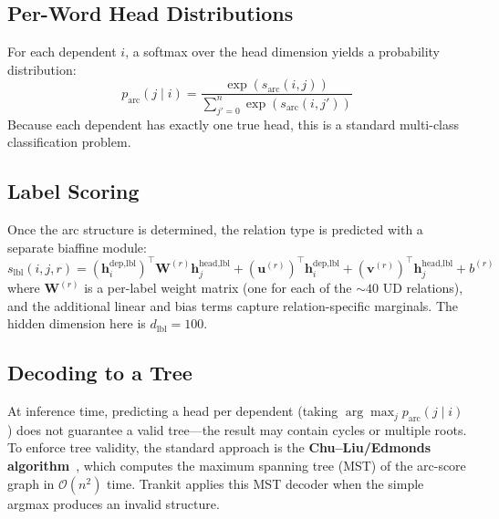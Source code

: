 \documentclass[12pt,a4paper,oneside]{report}
\begin{document}
\subsection{Per-Word Head Distributions}

For each dependent $i$, a softmax over the head dimension yields a probability
distribution:
\begin{equation}
  p_{\text{arc}}(j \mid i) = \frac{\exp(s_{\text{arc}}(i,j))}
                                  {\sum_{j' = 0}^{n} \exp(s_{\text{arc}}(i,j'))}
  \label{eq:arc_prob}
\end{equation}
Because each dependent has exactly one true head, this is a standard
multi-class classification problem.

\subsection{Label Scoring}

Once the arc structure is determined, the relation type is predicted with a
separate biaffine module:
\begin{equation}
  s_{\text{lbl}}(i,j,r) = (\mathbf{h}^{\text{dep,lbl}}_i)^\top
                            \mathbf{W}^{(r)} \mathbf{h}^{\text{head,lbl}}_j
                          + (\mathbf{u}^{(r)})^\top \mathbf{h}^{\text{dep,lbl}}_i
                          + (\mathbf{v}^{(r)})^\top \mathbf{h}^{\text{head,lbl}}_j
                          + b^{(r)}
  \label{eq:biaffine_lbl}
\end{equation}
where $\mathbf{W}^{(r)}$ is a per-label weight matrix (one for each of the
${\sim}40$ UD relations), and the additional linear and bias terms capture
relation-specific marginals. The hidden dimension here is
$d_{\text{lbl}} = 100$.

\subsection{Decoding to a Tree}

At inference time, predicting a head per dependent (taking $\arg\max_j
p_{\text{arc}}(j \mid i)$) does not guarantee a valid tree---the result may
contain cycles or multiple roots. To enforce tree validity, the standard
approach is the \textbf{Chu--Liu/Edmonds algorithm}~\citep{chuliu1965maxspan,
edmonds1967optimum}, which computes the maximum spanning tree (MST) of the
arc-score graph in $\mathcal{O}(n^2)$ time. Trankit applies this MST decoder
when the simple argmax produces an invalid structure.
\end{document}
